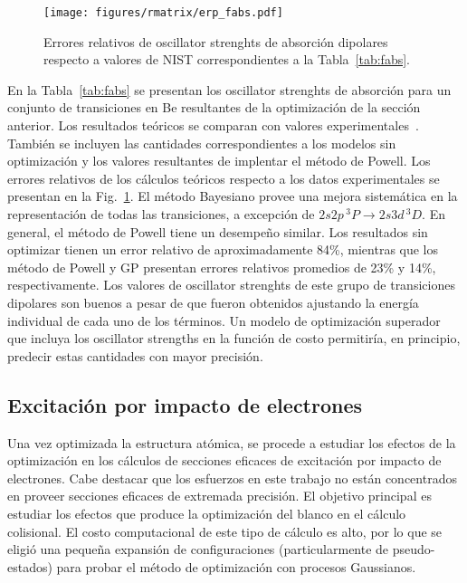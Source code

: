\begin{figure}
\centering
\texttt{[image: figures/rmatrix/erp\_fabs.pdf]} 
\caption{Errores relativos de oscillator strenghts de absorción 
dipolares respecto a valores de NIST correspondientes a la 
Tabla~\ref{tab:fabs}.}
\label{fig:fabs}
\end{figure}

En la Tabla~\ref{tab:fabs} se presentan los oscillator strenghts de 
absorción para un conjunto de transiciones en Be resultantes de la 
optimización de la sección anterior. Los resultados teóricos se comparan 
con valores experimentales~\cite{NIST}. También se incluyen las 
cantidades correspondientes a los modelos sin optimización y los valores 
resultantes de implentar el método de Powell. Los errores relativos de 
los cálculos teóricos respecto a los datos experimentales se presentan 
en la Fig.~\ref{fig:fabs}. El método Bayesiano provee una mejora 
sistemática en la representación de todas las transiciones, a excepción 
de $2s2p\,^3P\rightarrow 2s3d\,^3D$. En general, el método de Powell 
tiene un desempeño similar. Los resultados sin optimizar tienen un error 
relativo de aproximadamente 84\%, mientras que los método de Powell y GP 
presentan errores relativos promedios de 23\% y 14\%, respectivamente. 
Los valores de oscillator strenghts de este grupo de transiciones 
dipolares son buenos a pesar de que fueron obtenidos ajustando la 
energía individual de cada uno de los términos. Un modelo de 
optimización superador que incluya los oscillator strengths en la 
función de costo permitiría, en principio, predecir estas cantidades con 
mayor precisión.

\subsection{Excitación por impacto de electrones}

Una vez optimizada la estructura atómica, se procede a estudiar los 
efectos de la optimización en los cálculos de secciones eficaces de 
excitación por impacto de electrones. Cabe destacar que los esfuerzos en 
este trabajo no están concentrados en proveer secciones eficaces de 
extremada precisión. El objetivo principal es estudiar los efectos que 
produce la optimización del blanco en el cálculo colisional. 
El costo computacional de este tipo de cálculo es alto, por lo que se 
eligió una pequeña expansión de configuraciones (particularmente de 
pseudo-estados) para probar el método de optimización con procesos 
Gaussianos. 


